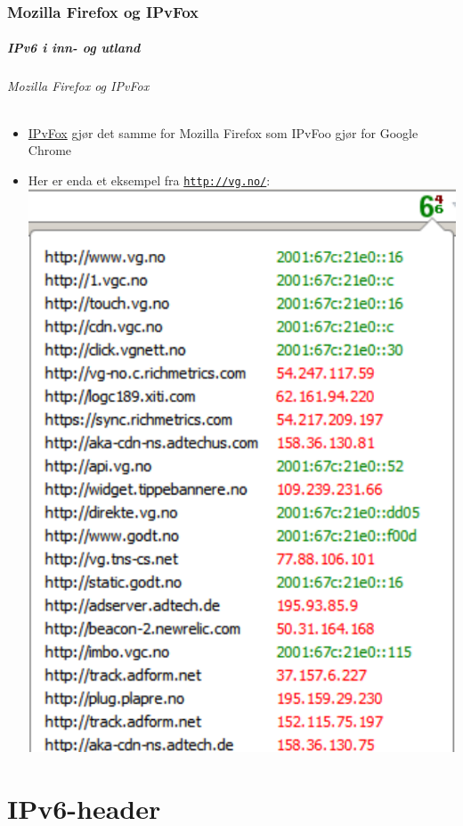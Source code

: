 \section{Mozilla Firefox og IPvFox}
\begin{frame}%
  \frametitle{IPv6 i inn- og utland}
  \framesubtitle{Mozilla Firefox og IPvFox}
  \begin{itemize}%
  \item
    \href{https://addons.mozilla.org/en-US/firefox/addon/ipvfox/}{IPvFox}
    gjør det samme for Mozilla Firefox som IPvFoo gjør for Google
    Chrome
  \item Her er enda et eksempel fra \texttt{\url{http://vg.no/}}:\\
  \includegraphics[scale=.4]{vg-dot-no-og-IPvFox-i-Mozilla-Firefox-forkortet.pdf}
  \end{itemize}
\end{frame}

\part{IPv6-header}

